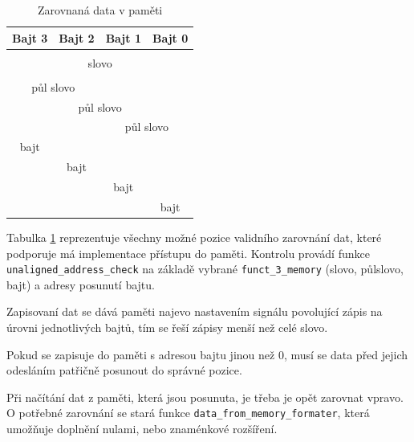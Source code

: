 \documentclass[FM,BP]{tulthesis}
\begin{document}
\begin{table}[h]
    \caption{Zarovnaná data v paměti}
    \label{table:zarovnana pamet}
    \begin{center}
        \begin{tabular}{|c|c|c|c|}
        \hline
        \textbf{Bajt 3} & 
        \textbf{Bajt 2} & 
        \textbf{Bajt 1} & 
        \textbf{Bajt 0}
        \\
        \hline
        \multicolumn{4}{|c|}{} \\
        \hline
        \multicolumn{4}{|c|}{slovo}\\
        \hline
        \multicolumn{4}{|c|}{}\\
        \cline{0-1}
        \multicolumn{2}{|c|}{půl slovo} & \multicolumn{2}{c|}{} \\
        \cline{0-2}
        & \multicolumn{2}{c|}{půl slovo} & \\
        \cline{2-4}
        \multicolumn{2}{|c}{} & \multicolumn{2}{|c|}{půl slovo} \\
        \cline{3-4}
        \cline{0-0}
        bajt & \multicolumn{3}{c|}{}
        \\
        \cline{0-1}
        & bajt & \multicolumn{2}{c|}{} \\
        \cline{2-3}
        \multicolumn{2}{|c|}{} & bajt & \\
        \cline{3-4}
        \multicolumn{3}{|c|}{} & bajt \\
        \hline
        \end{tabular}
    \end{center}
\end{table}

Tabulka \ref{table:zarovnana pamet} reprezentuje všechny možné pozice validního zarovnání dat, které podporuje má implementace přístupu do paměti. Kontrolu provádí funkce \verb|unaligned_address_check| na základě vybrané \verb|funct_3_memory| (slovo, půlslovo, bajt) a adresy posunutí bajtu. 

Zapisovaní dat se dává paměti najevo nastavením signálu povolující zápis na úrovni jednotlivých bajtů, tím se řeší zápisy menší než celé slovo.

Pokud se zapisuje do paměti s adresou bajtu jinou než 0, musí se data před jejich odesláním patřičně posunout do správné pozice.

Při načítání dat z paměti, která jsou posunuta, je třeba je opět zarovnat vpravo. O potřebné zarovnání se stará funkce \verb|data_from_memory_formater|, která umožňuje doplnění nulami, nebo znaménkové rozšíření. 
\end{document}
